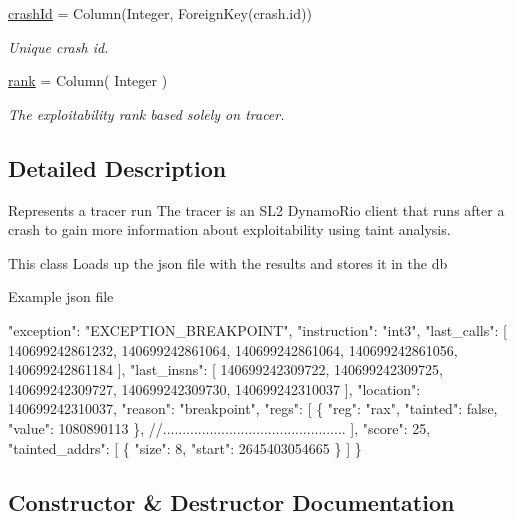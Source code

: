 \begin{DoxyCompactItemize}
\mbox{\hyperlink{classdb_1_1tracer_1_1_tracer_a421ab96c69a6d49d1ad4b4e8547196e4}{crash\+Id}} = Column(Integer, Foreign\+Key(\textquotesingle{}crash.\+id\textquotesingle{}))
\begin{DoxyCompactList}\small\item\em Unique crash id. \end{DoxyCompactList}\item 
\mbox{\label{classdb_1_1tracer_1_1_tracer_ae63a4bf9425cf762e41e18c68e94f93c}} 
\mbox{\hyperlink{classdb_1_1tracer_1_1_tracer_ae63a4bf9425cf762e41e18c68e94f93c}{rank}} = Column( Integer )
\begin{DoxyCompactList}\small\item\em The exploitability rank based solely on tracer. \end{DoxyCompactList}\end{DoxyCompactItemize}


\subsection{Detailed Description}
Represents a tracer run The tracer is an S\+L2 Dynamo\+Rio client that runs after a crash to gain more information about exploitability using taint analysis. 

This class Loads up the json file with the results and stores it in the db

Example json file 
\begin{DoxyPre}
     "exception": "EXCEPTION\_BREAKPOINT",
     "instruction": "int3",
     "last\_calls": [
         140699242861232,
         140699242861064,
         140699242861064,
         140699242861056,
         140699242861184
     ],
     "last\_insns": [
         140699242309722,
         140699242309725,
         140699242309727,
         140699242309730,
         140699242310037
     ],
     "location": 140699242310037,
     "reason": "breakpoint",
     "regs": [
         \{
             "reg": "rax",
             "tainted": false,
             "value": 1080890113
         \},
         //...............................................
     ],
     "score": 25,
     "tainted\_addrs": [
         \{
             "size": 8,
             "start": 2645403054665
         \}
     ]
 \}
 \end{DoxyPre}
 

\subsection{Constructor \& Destructor Documentation}
\mbox{\label{classdb_1_1tracer_1_1_tracer_ae6ad30159b715a1a432885f34316faa5}} 
